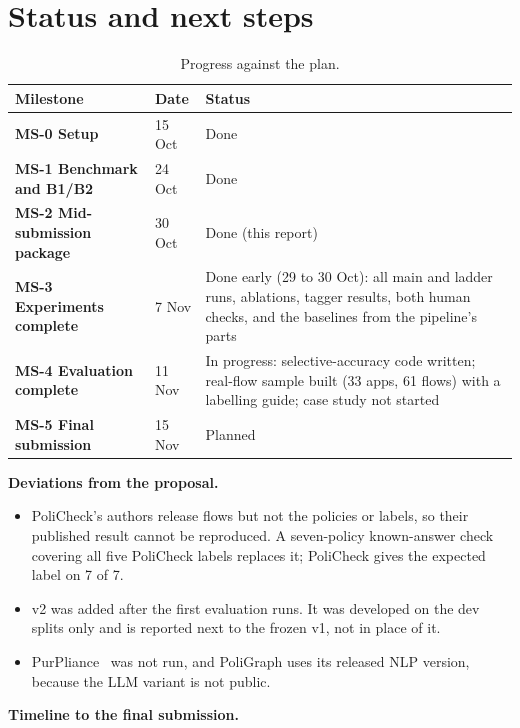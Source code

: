 \documentclass[11pt,a4paper]{article}
\newcommand{\rowline}{\specialrule{0.2pt}{3pt}{3pt}}
\begin{document}
\section{Status and next steps}

\begin{table}[H]
\centering
\small
\begin{tabular}{llL{8.6cm}}
\toprule
Milestone & Date & Status \\
\midrule
\textbf{MS-0 Setup} & 15 Oct & Done \\ \rowline
\textbf{MS-1 Benchmark and B1/B2} & 24 Oct & Done \\ \rowline
\textbf{MS-2 Mid-submission package} & 30 Oct & Done (this report) \\ \rowline
\textbf{MS-3 Experiments complete} & 7 Nov & Done early (29 to 30 Oct): all main and ladder runs,
ablations, tagger results, both human checks, and the baselines from the pipeline's
parts \\ \rowline
\textbf{MS-4 Evaluation complete} & 11 Nov & In progress: selective-accuracy code written;
real-flow sample built (33 apps, 61 flows) with a labelling guide; case study not
started \\ \rowline
\textbf{MS-5 Final submission} & 15 Nov & Planned \\
\bottomrule
\end{tabular}
\caption{Progress against the plan.}
\end{table}

\textbf{Deviations from the proposal.}
\begin{itemize}
  \item PoliCheck's authors release flows but not the policies or labels, so their published result
        cannot be reproduced. A seven-policy known-answer check covering all five PoliCheck labels
        replaces it; PoliCheck gives the expected label on 7 of 7.
  \item v2 was added after the first evaluation runs. It was developed on the dev splits only and
        is reported next to the frozen v1, not in place of it.
  \item PurPliance~\cite{purpliance} was not run, and PoliGraph uses its released NLP version,
        because the LLM variant is not public.
\end{itemize}

\textbf{Timeline to the final submission.}
\end{document}
